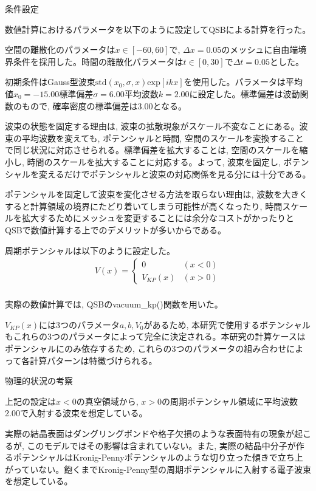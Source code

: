 \documentclass[a4paper, lualatex]{bxjsarticle}
\begin{document}
\begin{section}{条件設定}
    \par 数値計算におけるパラメータを以下のように設定してQSBによる計算を行った。
    \par 空間の離散化のパラメータは$x\in [-60, 60]$で, $\varDelta x=0.05$のメッシュに自由端境界条件を採用した。時間の離散化パラメータは$t\in [0, 30]$で$\varDelta t=0.05$とした。
    \par 初期条件はGauss型波束$\mathrm{std}(x_0, \sigma, x)\mathrm{exp}[ikx]$を使用した。パラメータは平均値$x_0=-15.00$標準偏差$\sigma=6.00$平均波数$k=2.00$に設定した。標準偏差は波動関数のもので, 確率密度の標準偏差は3.00となる。
    \par 波束の状態を固定する理由は, 波束の拡散現象がスケール不変なことにある。波束の平均波数を変えても, ポテンシャルと時間, 空間のスケールを変換することで同じ状況に対応させられる。標準偏差を拡大することは, 空間のスケールを縮小し, 時間のスケールを拡大することに対応する。よって, 波束を固定し, ポテンシャルを変えるだけでポテンシャルと波束の対応関係を見る分には十分である。
    \par ポテンシャルを固定して波束を変化させる方法を取らない理由は, 波数を大きくすると計算領域の境界にたどり着いてしまう可能性が高くなったり, 時間スケールを拡大するためにメッシュを変更することには余分なコストがかったりとQSBで数値計算する上でのデメリットが多いからである。
    \par 周期ポテンシャルは以下のように設定した。
    \begin{align}
     V(x)=\begin{cases}0&(x<0)\\V_{KP}(x)&(x>0)\end{cases}\nonumber\\
    \end{align}
    \par 実際の数値計算では, QSBのvacuum\_kp()関数を用いた。
    \par $V_{KP}(x)$には3つのパラメータ$a, b, V_0$があるため, 本研究で使用するポテンシャルもこれらの3つのパラメータによって完全に決定される。本研究の計算ケースはポテンシャルにのみ依存するため, これらの3つのパラメータの組み合わせによって各計算パターンは特徴づけられる。
    \begin{subsection}{物理的状況の考察}
        \par 上記の設定は$x<0$の真空領域から, $x>0$の周期ポテンシャル領域に平均波数2.00で入射する波束を想定している。
        \par 実際の結晶表面はダングリングボンドや格子欠損のような表面特有の現象が起こるが, このモデルではその影響は含まれていない。また, 実際の結晶中分子が作るポテンシャルはKronig-Pennyポテンシャルのような切り立った傾きで立ち上がっていない。飽くまでKronig-Penny型の周期ポテンシャルに入射する電子波束を想定している。

\end{subsection}
\end{section}
\end{document}
